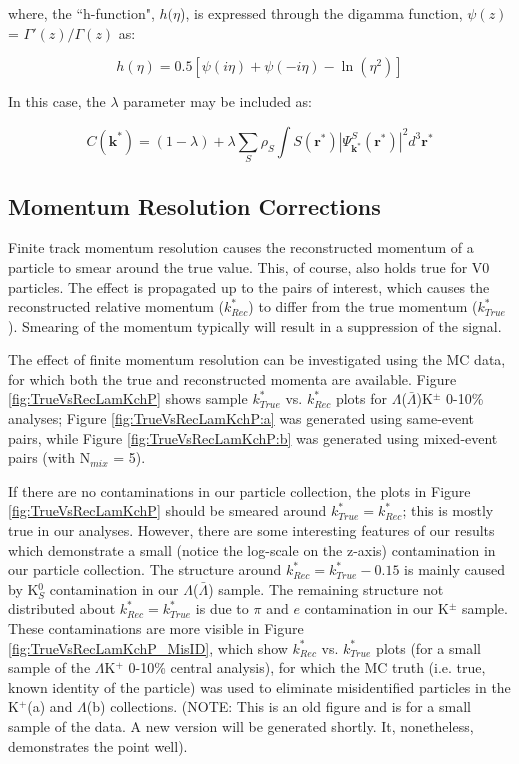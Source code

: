 \documentclass[ALICE,manyauthors]{cernphprep}
\begin{document}
where, the ``h-function", $h(\eta$), is expressed through the digamma function, $\psi(z)$ = $\Gamma'(z)/\Gamma(z)$ as:

\begin{equation}
 h(\eta) = 0.5[\psi(i\eta) + \psi(-i\eta) - \ln(\eta^{2})]
\label{eqn:LednickyHFunction}
\end{equation} 

In this case, the $\lambda$ parameter may be included as: 

\begin{equation}
 C(\mathbf{k^{*}}) = (1 - \lambda) + \lambda\sum\limits_{S}\rho_{S}\int S(\mathbf{r^{*}})|\Psi^{S}_{\mathbf{k^{*}}}(\mathbf{r^{*}})|^{2}d^{3}\mathbf{r^{*}}
\label{eqn:GenCfEqnwLambda}
\end{equation}


\subsection{Momentum Resolution Corrections}
\label{MomentumResolutionCorrections}

Finite track momentum resolution causes the reconstructed momentum of a particle to smear around the true value.
This, of course, also holds true for V0 particles.
The effect is propagated up to the pairs of interest, which causes the reconstructed relative momentum ($k^{*}_{Rec}$) to differ from the true momentum ($k^{*}_{True}$).
Smearing of the momentum typically will result in a suppression of the signal.

The effect of finite momentum resolution can be investigated using the MC data, for which both the true and reconstructed momenta are available.
Figure \ref{fig:TrueVsRecLamKchP} shows sample $k^{*}_{True}$ vs. $k^{*}_{Rec}$ plots for $\Lambda$($\bar{\Lambda}$)K$^{\pm}$ 0-10\% analyses; Figure \ref{fig:TrueVsRecLamKchP:a} was generated using same-event pairs, while Figure \ref{fig:TrueVsRecLamKchP:b} was generated using mixed-event pairs (with N$_{mix}$ = 5).  


If there are no contaminations in our particle collection, the plots in Figure \ref{fig:TrueVsRecLamKchP} should be smeared around $k^{*}_{True} = k^{*}_{Rec}$; this is mostly true in our analyses.
However, there are some interesting features of our results which demonstrate a small (notice the log-scale on the z-axis) contamination in our particle collection.
The structure around $k^{*}_{Rec} = k^{*}_{True}-0.15$ is mainly caused by K$^{0}_{S}$ contamination in our $\Lambda$($\bar{\Lambda}$) sample.
The remaining structure not distributed about $k^{*}_{Rec} = k^{*}_{True}$ is due to $\pi$ and $e$ contamination in our K$^{\pm}$ sample.
These contaminations are more visible in Figure \ref{fig:TrueVsRecLamKchP_MisID}, which show $k^{*}_{Rec}$ vs. $k^{*}_{True}$ plots (for a small sample of the $\Lambda$K$^{+}$ 0-10\% central analysis), for which the MC truth (i.e. true, known identity of the particle) was used to eliminate misidentified particles in the K$^{+}$(a) and $\Lambda$(b) collections. (NOTE: This is an old figure and is for a small sample of the data.  A new version will be generated shortly.  It, nonetheless, demonstrates the point well).
\end{document}
